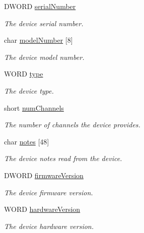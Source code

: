 \begin{DoxyCompactItemize}
\item 
D\+W\+O\+RD \hyperlink{struct_t_l_i___hardware_information_a12b5a17933bc3994f7e9528f43225027}{serial\+Number}
\begin{DoxyCompactList}\small\item\em The device serial number. \end{DoxyCompactList}\item 
char \hyperlink{struct_t_l_i___hardware_information_ac16741feceb318566ac45778c5d86d46}{model\+Number} \mbox{[}8\mbox{]}
\begin{DoxyCompactList}\small\item\em The device model number. \end{DoxyCompactList}\item 
W\+O\+RD \hyperlink{struct_t_l_i___hardware_information_a80d88eee72548d71a89e2c0187fd2b7c}{type}
\begin{DoxyCompactList}\small\item\em The device type. \end{DoxyCompactList}\item 
short \hyperlink{struct_t_l_i___hardware_information_a62318aa99077efaf363738d7b4f5f11d}{num\+Channels}
\begin{DoxyCompactList}\small\item\em The number of channels the device provides. \end{DoxyCompactList}\item 
char \hyperlink{struct_t_l_i___hardware_information_a9f969c072180e7bf58aa629ac862fa3a}{notes} \mbox{[}48\mbox{]}
\begin{DoxyCompactList}\small\item\em The device notes read from the device. \end{DoxyCompactList}\item 
D\+W\+O\+RD \hyperlink{struct_t_l_i___hardware_information_a853850c73c53b669035d424a89f32f57}{firmware\+Version}
\begin{DoxyCompactList}\small\item\em The device firmware version. \end{DoxyCompactList}\item 
W\+O\+RD \hyperlink{struct_t_l_i___hardware_information_a322185a1371c1f43d70aadcac092d96f}{hardware\+Version}
\begin{DoxyCompactList}\small\item\em The device hardware version. \end{DoxyCompactList}\item 

\end{DoxyCompactItemize}
